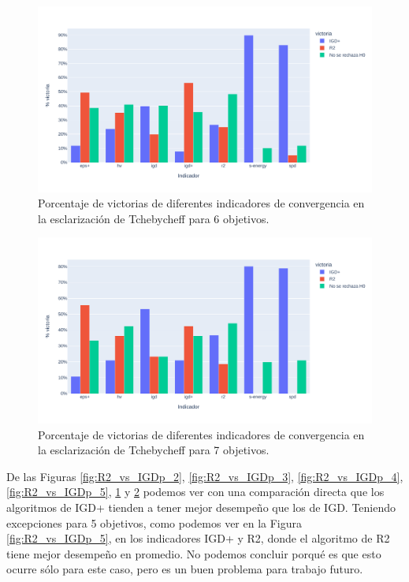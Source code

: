 \begin{figure} [H]
    \centering
\includegraphics[width=\textwidth]{Figuras/R2_vs_IGDp_nobj6.pdf}
\caption[IGD+ vs R2 6 objetivos]{Porcentaje de victorias de diferentes indicadores de convergencia en la esclarización de Tchebycheff para 6 objetivos.}
\label{fig:R2_vs_IGDp_6}
\end{figure}

\begin{figure} [H]
    \centering
\includegraphics[width=\textwidth]{Figuras/R2_vs_IGDp_nobj7.pdf}
\caption[IGD+ vs R2 7 objetivos]{Porcentaje de victorias de diferentes indicadores de convergencia en la esclarización de Tchebycheff para 7 objetivos.}
\label{fig:R2_vs_IGDp_7}
\end{figure}

De las Figuras \ref{fig:R2_vs_IGDp_2}, \ref{fig:R2_vs_IGDp_3}, \ref{fig:R2_vs_IGDp_4}, \ref{fig:R2_vs_IGDp_5}, \ref{fig:R2_vs_IGDp_6} y \ref{fig:R2_vs_IGDp_7}  podemos ver con una comparación directa que los algoritmos de IGD+ tienden a tener mejor desempeño que los de IGD. Teniendo excepciones para 5 objetivos, como podemos ver en la Figura \ref{fig:R2_vs_IGDp_5}, en los indicadores IGD+ y R2, donde el algoritmo de R2 tiene mejor desempeño en promedio. No podemos concluir porqué es que esto ocurre sólo para este caso, pero es un buen problema para trabajo futuro.

